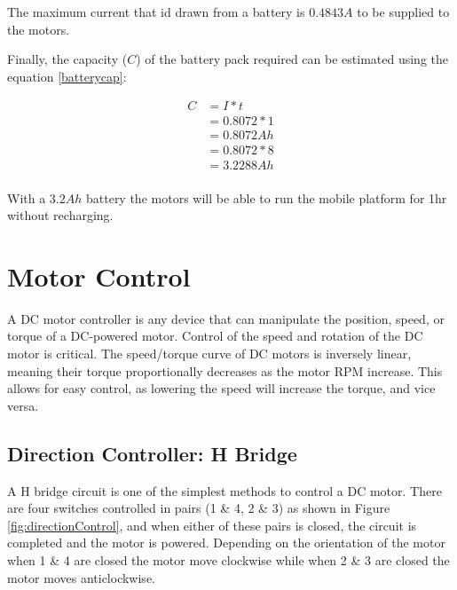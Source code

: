 The maximum current that id drawn from a battery is $0.4843A$ to be supplied to the motors.

Finally, the capacity ($C$) of the battery pack required can be estimated using the equation \ref{batterycap}:

\begin{equation} \label{batterycap}
\begin{split}
C & = I * t\\
& = 0.8072 * 1 \\
& = 0.8072Ah \\
& = 0.8072 * 8 \\ 
& = 3.2288 Ah \\
\end{split}
\end{equation}

With a $3.2 Ah$ battery the motors will be able to run the mobile platform for 1hr without recharging.

\section{Motor Control}

A \ac{DC} motor controller is any device that can manipulate the position, speed, or torque of a \ac{DC}-powered motor. Control of the speed and rotation of the \ac{DC} motor is critical. The speed/torque curve of \ac{DC} motors is inversely linear, meaning their torque proportionally decreases as the motor \ac{RPM} increase. This allows for easy control, as lowering the speed will increase the torque, and vice versa.

\subsection{Direction Controller: H Bridge}

A H bridge circuit is one of the simplest methods to control a \ac{DC} motor. There are four switches controlled in pairs (1 \& 4, 2 \& 3) as shown in Figure \ref{fig:directionControl}, and when either of these pairs is closed, the circuit is completed and the motor is powered. Depending on the orientation of the motor when 1 \& 4 are closed the motor move clockwise while when 2 \& 3 are closed the motor moves anticlockwise.


